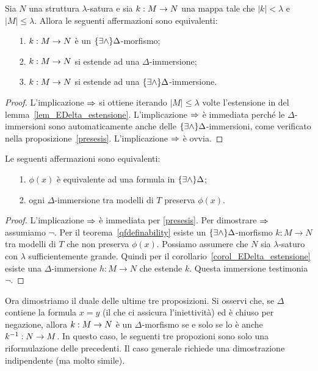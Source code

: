 \begin{corollary}\label{corol_EDelta_estensione}
Sia $N$ una struttura $\lambda$-satura e sia $k:M\rightarrow N$ una mappa tale che $|k|<\lambda$ e $|M|\le\lambda$. Allora le seguenti affermazioni sono equivalenti:
\begin{itemize}
\item[1.] $k:M\rightarrow N$ \`e un $\{\exists\wedge\}\Delta$-morfismo;
\item[2.] $k:M\rightarrow N$ si estende ad una $\Delta$-immersione;
\item[3.] $k:M\rightarrow N$ si estende ad una $\{\exists\wedge\}\Delta$-immersione.
\end{itemize}
\end{corollary}
\begin{proof}
L'implicazione $\Rightarrow$ si ottiene iterando $|M|\le\lambda$ volte l'estensione in  del lemma~\ref{lem_EDelta_estensione}. L'implicazione $\Rightarrow$ \`e immediata perch\'e le $\Delta$-immersioni sono automaticamente anche delle $\{\exists\wedge\}\Delta$-immersioni, come verificato nella proposizione~\ref{presesis}. L'implicazione $\Rightarrow$ \`e ovvia.
\end{proof}


\begin{theorem}
Le seguenti affermazioni sono equivalenti:
\begin{itemize}
\item[1.] $\phi(x)$ \`e equivalente ad una formula in $\{\exists\wedge\}\Delta$;
\item[2.] ogni $\Delta$-immersione tra modelli di $T$ preserva $\phi(x)$.
\end{itemize}
\end{theorem}
\begin{proof}
L'implicazione $\Rightarrow$ \`e immediata per \ref{presesis}. Per dimostrare  $\Rightarrow$ assumiamo $\neg$. Per il teorema~\ref{qfdefinability} esiste un $\{\exists\wedge\}\Delta$-morfismo $k:M\to N$ tra modelli di $T$ che non preserva $\phi(x)$. Possiamo assumere che $N$ sia $\lambda$-saturo con $\lambda$ sufficientemente grande. Quindi per il corollario~\ref{corol_EDelta_estensione} esiste una $\Delta$-immersione $h:M\to N$ che estende $k$. Questa immersione testimonia $\neg$.
\end{proof}

Ora dimostriamo il duale delle ultime tre proposizioni. Si osservi che, se $\Delta$ contiene la formula $x=y$ (il che ci assicura l'iniettivit\`a) ed \`e chiuso per negazione, allora  $k:M\rightarrow N$ \`e un $\Delta$-morfismo se e solo se lo \`e anche $k^{-1}:N\rightarrow M$. In questo caso, le seguenti tre propozioni sono solo una riformulazione delle precedenti.  Il caso generale richiede una dimostrazione indipendente (ma molto simile).

